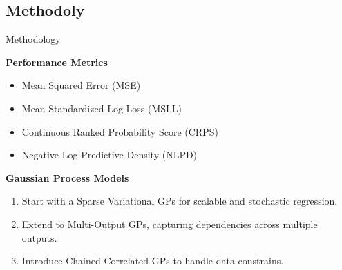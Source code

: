 \subsection{Methodoly}
\begin{frame}{Methodology}
	\justifying
	\begin{block}{\textbf{Performance Metrics}}
	\begin{itemize}
		\item Mean Squared Error (MSE)
		\item Mean Standardized Log Loss (MSLL)
		\item Continuous Ranked Probability Score (CRPS)
		\item Negative Log Predictive Density (NLPD)
	\end{itemize}
	\end{block}
	
	\begin{block}{\textbf{Gaussian Process Models}}
	\begin{enumerate}
		\item Start with a Sparse Variational GPs for scalable and stochastic regression.
		\item Extend to Multi-Output GPs, capturing dependencies across multiple outputs.
		\item Introduce Chained Correlated GPs to handle data constrains.
	\end{enumerate}
	\end{block}
\end{frame}
